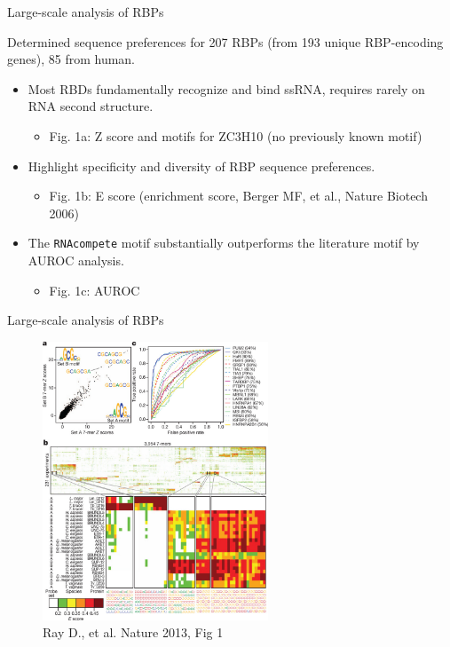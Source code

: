 \documentclass[professionalfont, 12pt, default]{beamer}
\providecommand{\tightlist}{%
    \setlength{\itemsep}{0pt}\setlength{\parskip}{0pt}}
\begin{document}
\begin{frame}[fragile]{Large-scale analysis of RBPs}

Determined sequence preferences for 207 RBPs (from 193 unique
RBP-encoding genes), 85 from human.

\begin{itemize}
\tightlist
\item
  Most RBDs fundamentally recognize and bind ssRNA, requires rarely on
  RNA second structure.

  \begin{itemize}
  \tightlist
  \item
    Fig. 1a: Z score and motifs for ZC3H10 (no previously known motif)
  \end{itemize}
\item
  Highlight specificity and diversity of RBP sequence preferences.

  \begin{itemize}
  \tightlist
  \item
    Fig. 1b: E score (enrichment score, Berger MF, et al., Nature
    Biotech 2006)
  \end{itemize}
\item
  The \texttt{RNAcompete} motif substantially outperforms the literature
  motif by AUROC analysis.

  \begin{itemize}
  \tightlist
  \item
    Fig. 1c: AUROC
  \end{itemize}
\end{itemize}

\end{frame}

\begin{frame}{Large-scale analysis of RBPs}

\begin{figure}
\centering
\includegraphics[width=0.60000\textwidth]{img/f1.jpg}
\caption{Ray D., et al. Nature 2013, Fig 1}
\end{figure}

\end{frame}
\end{document}
